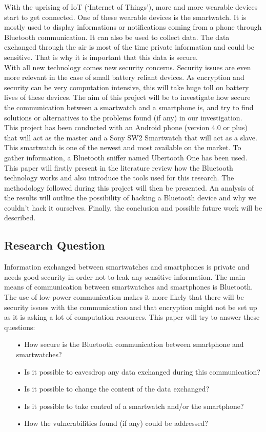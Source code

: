 
With the uprising of IoT (‘Internet of Things’), more and more wearable devices start to get connected. One of these wearable devices is the smartwatch. It is mostly used to display informations or notifications coming from a phone through Bluetooth communication. It can also be used to collect data. The data exchanged through the air is most of the time private information and could be sensitive. That is why it is important that this data is secure.\\

With all new technology comes new security concerns. Security issues are even more relevant in the case of small battery reliant devices. As encryption and security can be very computation intensive, this will take huge toll on battery lives of these devices. The aim of this project will be to investigate how secure the communication between a smartwatch and a smartphone is, and try to find solutions or alternatives to the problems found (if any) in our investigation.\\

This project has been conducted with an Android phone (version 4.0 or plus) that will act as the master and a Sony SW2 Smartwatch that will act as a slave. This smartwatch is one of the newest and most available on the market. To gather information, a Bluetooth sniffer named Ubertooth One has been used.\\

This paper will firstly present in the literature review  how the Bluetooth technology works and also introduce the tools used for this research. The methodology followed during this project will then be presented. An analysis of the results will outline the possibility of hacking a Bluetooth device and why we couldn't hack it ourselves. Finally, the conclusion and possible future work will be described.
\newpage
\subsection{Research Question}
Information exchanged between smartwatches and smartphones is private and needs good security in order not to leak any sensitive information. 
The main means of communication between smartwatches and smartphones is Bluetooth.
The use of low-power communication makes it more likely that there will be security issues with the communication and that encryption might not be set up as it is asking a lot of computation resources. 
This paper will try to answer these questions:
\begin{itemize}
\item[•] How secure is the Bluetooth communication between smartphone and smartwatches?
\item[•]Is it possible to eavesdrop any data exchanged during this communication?
\item[•]Is it possible to change the content of the data exchanged?
\item[•]Is it possible to take control of a smartwatch and/or the smartphone?
\item[•]How the vulnerabilities found (if any) could be addressed?
\end{itemize}

